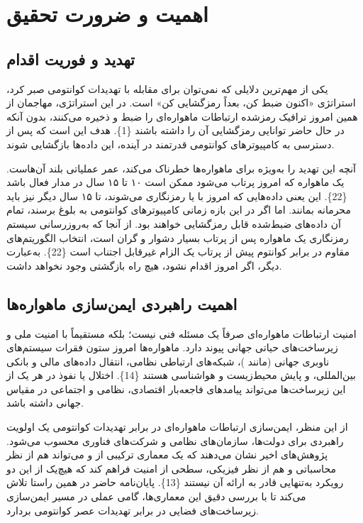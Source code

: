 \documentclass[a4paper,14pt]{extreport}
\begin{document}
\section{اهمیت و ضرورت تحقیق}

\subsection{تهدید  و فوریت اقدام}

یکی از مهم‌ترین دلایلی که نمی‌توان برای مقابله با تهدیدات کوانتومی صبر کرد، استراتژی «اکنون ضبط کن، بعداً رمزگشایی کن»  است. در این استراتژی، مهاجمان از همین امروز ترافیک رمزشده ارتباطات ماهواره‌ای را ضبط و ذخیره می‌کنند، بدون آنکه در حال حاضر توانایی رمزگشایی آن را داشته باشند \{1\}. هدف این است که پس از دسترسی به کامپیوترهای کوانتومی قدرتمند در آینده، این داده‌ها بازگشایی شوند.

آنچه این تهدید را به‌ویژه برای ماهواره‌ها خطرناک می‌کند، عمر عملیاتی بلند آن‌هاست. یک ماهواره که امروز پرتاب می‌شود ممکن است ۱۰ تا ۱۵ سال در مدار فعال باشد \{22\}. این یعنی داده‌هایی که امروز با  یا  رمزنگاری می‌شوند، تا ۱۵ سال دیگر نیز باید محرمانه بمانند. اما اگر در این بازه زمانی کامپیوترهای کوانتومی به بلوغ برسند، تمام آن داده‌های ضبط‌شده قابل رمزگشایی خواهند بود. از آنجا که به‌روزرسانی سیستم رمزنگاری یک ماهواره پس از پرتاب بسیار دشوار و گران است، انتخاب الگوریتم‌های مقاوم در برابر کوانتوم پیش از پرتاب یک الزام غیرقابل اجتناب است \{22\}. به‌عبارت دیگر، اگر امروز اقدام نشود، هیچ راه بازگشتی وجود نخواهد داشت.

\subsection{اهمیت راهبردی ایمن‌سازی ماهواره‌ها}

امنیت ارتباطات ماهواره‌ای صرفاً یک مسئله فنی نیست؛ بلکه مستقیماً با امنیت ملی و زیرساخت‌های حیاتی جهانی پیوند دارد. ماهواره‌ها امروز ستون فقرات سیستم‌های ناوبری جهانی (مانند )، شبکه‌های ارتباطی نظامی، انتقال داده‌های مالی و بانکی بین‌المللی، و پایش محیط‌زیست و هواشناسی هستند \{14\}. اختلال یا نفوذ در هر یک از این زیرساخت‌ها می‌تواند پیامدهای فاجعه‌بار اقتصادی، نظامی و اجتماعی در مقیاس جهانی داشته باشد.

از این منظر، ایمن‌سازی ارتباطات ماهواره‌ای در برابر تهدیدات کوانتومی یک اولویت راهبردی  برای دولت‌ها، سازمان‌های نظامی و شرکت‌های فناوری محسوب می‌شود. پژوهش‌های اخیر نشان می‌دهند که یک معماری ترکیبی از  و  می‌تواند هم از نظر محاسباتی و هم از نظر فیزیکی، سطحی از امنیت فراهم کند که هیچ‌یک از این دو رویکرد به‌تنهایی قادر به ارائه آن نیستند \{13\}. پایان‌نامه حاضر در همین راستا تلاش می‌کند تا با بررسی دقیق این معماری‌ها، گامی عملی در مسیر ایمن‌سازی زیرساخت‌های فضایی در برابر تهدیدات عصر کوانتومی بردارد.
\end{document}
